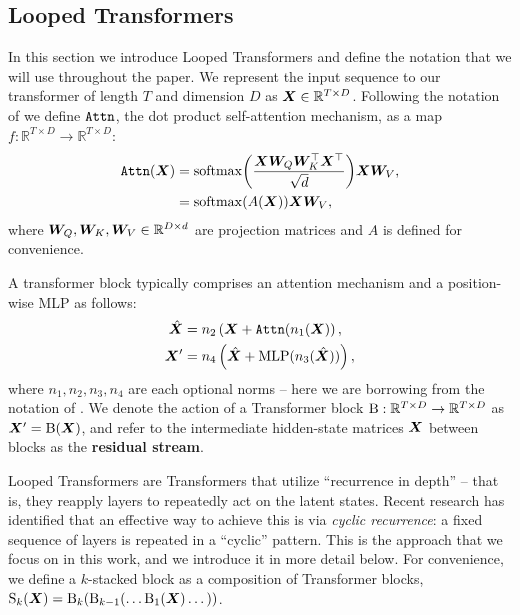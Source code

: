 \subsection{Looped Transformers}

In this section we introduce Looped Transformers and define the notation that we will use throughout the paper. We represent the input sequence to our transformer of length $T$ and dimension $D$ as ${\bm{X}} \in \mathbb{R}^{T \times D}$. Following the notation of \citet{yudin2025pay} we define $\operatorname{\texttt{Attn}}$, the dot product self-attention mechanism, as a map $f: \mathbb{R}^{T \times D} \to \mathbb{R}^{T \times D}$:
\begin{align}
    \operatorname{\texttt{Attn}}({\bm{X}}) &= \mathrm{softmax}{\left ( \frac{{\bm{X}} {\bm{W}}_Q {\bm{W}}_K^{\top} {\bm{X}}^{\top}}{\sqrt{d}} \right )} {\bm{X}}{\bm{W}}_V, \\ 
    &= \mathrm{softmax}{\left ( A({\bm{X}}) \right )} {\bm{X}}{\bm{W}}_V, \label{eq:attn_in_a}
\end{align}
where ${\bm{W}}_Q, {\bm{W}}_K, {\bm{W}}_V \in \mathbb{R}^{D \times d}$ are projection matrices and $A$ is defined for convenience. 

A transformer block typically comprises an attention mechanism and a position-wise MLP as follows:
\begin{align}
    \hat{{\bm{X}}} &= n_2 \left ( {\bm{X}} + \operatorname{\texttt{Attn}}(n_1({\bm{X}}) \right ), \label{eq:block_norm_1} \\
    {{\bm{X}}}' &= n_4 \left ( \hat{{\bm{X}}} + \text{MLP}(n_3(\hat{{\bm{X}}})) \right ), \label{eq:block_norm_2}
\end{align}
where $n_1, n_2, n_3, n_4$ are each optional norms -- here we are borrowing from the notation of \citet{geiping2025scaling}. We denote the action of a Transformer block $\operatorname{B}: \mathbb{R}^{T \times D} \to \mathbb{R}^{T \times D}$ as ${\bm{X}}' = \operatorname{B}({\bm{X}})$, and refer to the intermediate hidden-state matrices ${\bm{X}}$ between blocks as the \textbf{residual stream}.


Looped Transformers are Transformers that utilize ``recurrence in depth'' -- that is, they reapply layers to repeatedly act on the latent states. Recent research has identified that an effective way \citep{bae2025mixture} to achieve this is via \emph{cyclic recurrence}: a fixed sequence of layers is repeated in a ``cyclic'' pattern. This is the approach that we focus on in this work, and we introduce it in more detail below. For convenience, we define a $k$-stacked block as a composition of Transformer blocks,
$\operatorname{S}_k({\bm{X}}) = \operatorname{B}_k(\operatorname{B}_{k-1}(\dots \operatorname{B}_1({\bm{X}}) \dots))$.



